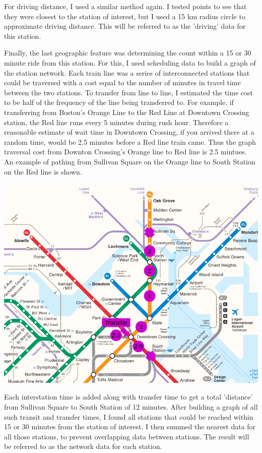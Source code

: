 \documentclass{article}
\begin{document}
For driving distance, I used a similar method again. I tested points to see that they were closest to the station of interest, but I used a 15 km radius circle to approximate driving distance. This will be referred to as the 'driving' data for this station.

Finally, the last geographic feature was determining the count within a 15 or 30 minute ride from this station. For this, I used scheduling data to build a graph of the station network. Each train line was a series of interconnected stations that could be traversed with a cost equal to the number of minutes in travel time between the two stations. To transfer from line to line, I estimated the time cost to be half of the frequency of the line being transferred to. For example, if transferring from Boston's Orange Line to the Red Line at Downtown Crossing station, the Red line runs every 5 minutes during rush hour. Therefore a reasonable estimate of wait time in Downtown Crossing, if you arrived there at a random time, would be 2.5 minutes before a Red line train came. Thus the graph traversal cost from Downton Crossing's Orange line to Red line is 2.5 mintues. An example of pathing from Sullivan Square on the Orange line to South Station on the Red line is shown. 

\begin{center}\includegraphics[scale=0.6]{transfer_with_markup}\end{center}

Each interstation time is added along with transfer time to get a total 'distance' from Sullivan Square to South Station of 12 minutes. After building a graph of all such transit and transfer times, I found all stations that could be reached within 15 or 30 minutes from the station of interest. I then summed the nearest data for all those stations, to prevent overlapping data between stations. The result will be referred to as the network data for each station. 
\end{document}
